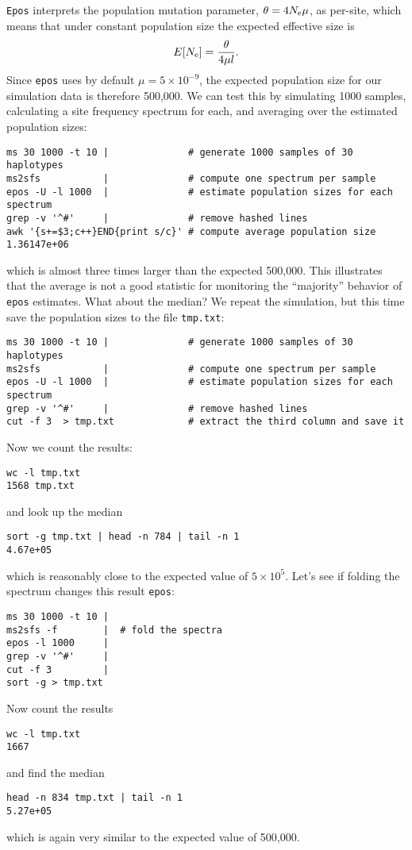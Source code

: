 \documentclass[a4paper]{article}
\newcommand{\ty}{\texttt}
\begin{document}
\begin{itemize}
\ty{Epos} interprets the population mutation parameter,
$\theta=4N_{\rm e}\mu$, as per-site, which means that under constant
population size the expected effective size is
\[
E[N_{\rm e}]=\frac{\theta}{4\mu l}.
\]
Since \ty{epos} uses by default $\mu=5\times 10^{-9}$, the expected
population size for our simulation data is therefore 500,000. We can
test this by simulating 1000 samples, calculating a site frequency
spectrum for each, and averaging over the estimated population sizes:
\begin{verbatim}
ms 30 1000 -t 10 |              # generate 1000 samples of 30 haplotypes
ms2sfs           |              # compute one spectrum per sample
epos -U -l 1000  |              # estimate population sizes for each spectrum
grep -v '^#'     |              # remove hashed lines
awk '{s+=$3;c++}END{print s/c}' # compute average population size
1.36147e+06
\end{verbatim}
which is almost three times larger than the expected 500,000. This
illustrates that the average is not a good statistic for monitoring
the ``majority'' behavior of \ty{epos} estimates. What about the
median? We repeat the simulation, but this time save the population sizes to
the file \ty{tmp.txt}:
\begin{verbatim}
ms 30 1000 -t 10 |              # generate 1000 samples of 30 haplotypes
ms2sfs           |              # compute one spectrum per sample
epos -U -l 1000  |              # estimate population sizes for each spectrum
grep -v '^#'     |              # remove hashed lines
cut -f 3  > tmp.txt             # extract the third column and save it
\end{verbatim}
Now we count the results:
\begin{verbatim}
wc -l tmp.txt
1568 tmp.txt
\end{verbatim}
and look up the median
\begin{verbatim}
sort -g tmp.txt | head -n 784 | tail -n 1
4.67e+05
\end{verbatim}
which is reasonably close to the expected value of $5\times 10^5$.
Let's see if folding the
spectrum changes this result 
\ty{epos}:
\begin{verbatim}
ms 30 1000 -t 10 | 
ms2sfs -f        |  # fold the spectra 
epos -l 1000     |  
grep -v '^#'     |
cut -f 3         |
sort -g > tmp.txt
\end{verbatim}
Now count the results
\begin{verbatim}
wc -l tmp.txt
1667
\end{verbatim}
and find the median
\begin{verbatim}
head -n 834 tmp.txt | tail -n 1
5.27e+05
\end{verbatim}
which is again very similar to the expected value of 500,000. 
\end{itemize}
\end{document}
